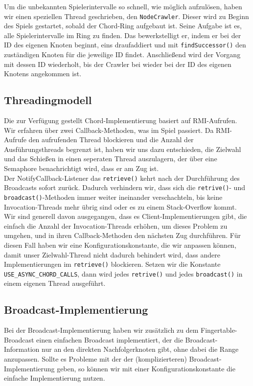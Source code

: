 Um die unbekannten Spielerintervalle so schnell, wie möglich aufzulösen, haben wir einen speziellen Thread geschrieben, den \texttt{NodeCrawler}. Dieser wird zu Beginn des Spiels gestartet, sobald der Chord-Ring aufgebaut ist. Seine Aufgabe ist es, alle Spielerintervalle im Ring zu finden. Das bewerkstelligt er, indem er bei der ID des eigenen Knoten beginnt, eins draufaddiert und mit \texttt{findSuccessor()} den zuständigen Knoten für die jeweilige ID findet. Anschließend wird der Vorgang mit dessen ID wiederholt, bis der Crawler bei wieder bei der ID des eigenen Knotens angekommen ist.


\subsection{Threadingmodell}
Die zur Verfügung gestellt Chord-Implementierung basiert auf RMI-Aufrufen. Wir erfahren über zwei Callback-Methoden, was im Spiel passiert.
Da RMI-Aufrufe den aufrufenden Thread blockieren und die Anzahl der Ausführungsthreads begrenzt ist, haben wir uns dazu entschieden, die Zielwahl und das Schießen in einen seperaten Thread auszulagern, der über eine Semaphore benachrichtigt wird, dass er am Zug ist.\\

Der NotifyCallback-Listener das \texttt{retrieve()} kehrt nach der Durchführung des Broadcasts sofort zurück. Dadurch verhindern wir, dass sich die \texttt{retrive()}- und \texttt{broadcast()}-Methoden immer weiter ineinander verschachteln, bis keine Invocation-Threads mehr übrig sind oder es zu einem Stack-Overflow kommt. Wir sind generell davon ausgegangen, dass es Client-Implementierungen gibt, die einfach die Anzahl der Invocation-Threads erhöhen, um dieses Problem zu umgehen, und in ihren Callback-Methoden den nächsten Zug durchführen. Für diesen Fall haben wir eine Konfigurationskonstante, die wir anpassen können, damit unser Zielwahl-Thread nicht dadurch behindert wird, dass andere Implementierungen im \texttt{retrieve()} blockieren. Setzen wir die Konstante \texttt{USE\_ASYNC\_CHORD\_CALLS}, dann wird jedes \texttt{retrive()} und jedes \texttt{broadcast()} in einem eigenen Thread ausgeführt.\\


\subsection{Broadcast-Implementierung}
Bei der Broadcast-Implementierung haben wir zusätzlich zu dem Fingertable-Broadcast einen einfachen Broadcast implementiert, der die Broadcast-Information nur an den direkten Nachfolgerknoten gibt, ohne dabei die Range anzupassen. Sollte es Probleme mit der der (komplizierteren) Broadcast-Implementierung geben, so können wir mit einer Konfigurationskonstante die einfache Implementierung nutzen.\\

